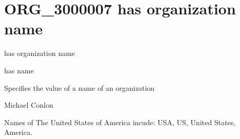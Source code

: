\documentclass[letterpaper,10pt,english]{sphinxmanual}
\begin{document}
\section{ORG\_3000007 \sphinxhyphen{} has organization name}
\label{\detokenize{doc-ORG_3000007:org-3000007-has-organization-name}}\label{\detokenize{doc-ORG_3000007:index-0}}\label{\detokenize{doc-ORG_3000007::doc}}
\begin{sphinxShadowBox}

\sphinxAtStartPar
has organization name
\end{sphinxShadowBox}

\begin{sphinxShadowBox}

\sphinxAtStartPar
has name
\end{sphinxShadowBox}

\begin{sphinxShadowBox}

\sphinxAtStartPar
{}
\end{sphinxShadowBox}

\begin{sphinxShadowBox}

\sphinxAtStartPar
Specifies the value of a name of an organization
\end{sphinxShadowBox}

\begin{sphinxShadowBox}

\sphinxAtStartPar
Michael Conlon 
\end{sphinxShadowBox}

\begin{sphinxShadowBox}

\sphinxAtStartPar
{\hyperref[\detokenize{doc-ORG_0000001::doc}]{}}
\end{sphinxShadowBox}

\begin{sphinxShadowBox}

\sphinxAtStartPar
{}
\end{sphinxShadowBox}

\begin{sphinxShadowBox}

\sphinxAtStartPar
Names of The United States of America incude: USA, US, United States, America.
\end{sphinxShadowBox}
\end{document}
